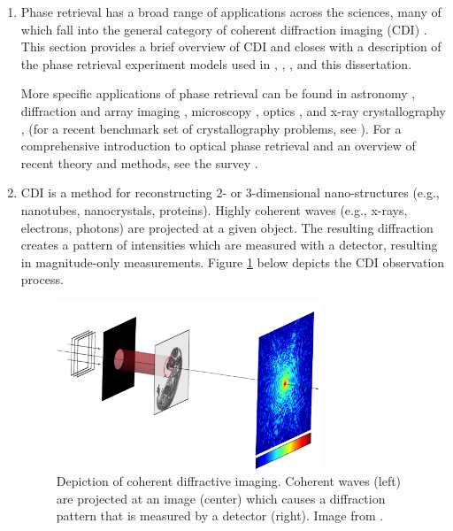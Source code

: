 \begin{enumerate}

\item
Phase retrieval has a broad range of applications across the sciences, many of which fall into the general category of coherent diffraction imaging (CDI) \cite{miao1999extending}.  This section provides a brief overview of CDI and closes with a description of the phase retrieval experiment models used in 
\cite{DBLP:journals/siamis/CandesESV13}, \cite{DBLP:journals/tit/CandesLS15}, \cite{DBLP:journals/siamsc/FriedlanderM16}, and this dissertation.


More specific applications of phase retrieval can be found in astronomy \cite{fienup1987phase}, diffraction and array imaging \cite{bunk2007diffractive} \cite{chai2010array}, microscopy \cite{miao2008extending}, optics \cite{walther1963question}, and x-ray crystallography \cite{harrison1993phase}, \cite{millane1990phase} (for a recent benchmark set of crystallography problems, see \cite{elser2017benchmark}).  For a comprehensive introduction to optical phase retrieval and an overview of recent theory and methods, see the survey \cite{DBLP:journals/spm/ShechtmanECCMS15}.

\item
CDI is a method for reconstructing $2$- or $3$-dimensional nano-structures (e.g., nanotubes, nanocrystals, proteins).  Highly coherent waves (e.g., x-rays, electrons, photons) are projected at a given object.  The resulting diffraction creates a pattern of intensities which are measured with a detector, resulting in magnitude-only measurements.  Figure \ref{Fig:CDI} below depicts the CDI observation process.

\begin{figure}[H]
  \centering
    \includegraphics[width=0.75\textwidth]{phase_retrieval_depiction_mod.jpg}
   \caption{Depiction of coherent diffractive imaging.  Coherent waves (left) are projected at an image (center) which causes a diffraction pattern that is measured by a detector (right). Image from \cite{Guizar-Sicairos}.}
   \label{Fig:CDI}
\end{figure}


\end{enumerate}
